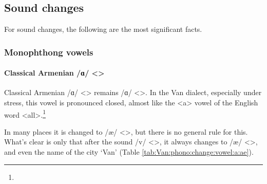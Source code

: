 \subsection{Sound changes}
For sound changes, the following are the most significant facts. 


\begin{adjarianpage}\label{page:141}\end{adjarianpage}%

\subsubsection{Monophthong vowels}
\paragraph{Classical Armenian /ɑ/ <>}\label{sec:Van:phono:soundchange:monovowel:a}


Classical Armenian /ɑ/ <>  remains /ɑ/ <>. In the Van dialect, especially under stress, this vowel is pronounced closed, almost like the <a> vowel of the English word <all>.\footnote{} 


In many places it is changed to /æ/ <>, but there is no general rule for this. What's clear is only that after the sound /v/ <>, it always changes to /æ/ <>, and even the name of the city `Van' (Table \ref{tab:Van:phono:change:vowel:a:ae}).

